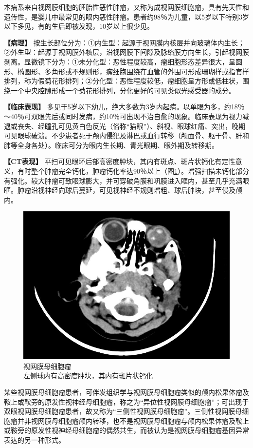 本病系来自视网膜细胞的胚胎性恶性肿瘤，又称为成视网膜细胞瘤，具有先天性和遗传性，是婴儿中最常见的眼内恶性肿瘤。患者约98％为儿童，以5岁以下特别3岁以下多见，有的生后即被发现，10岁以上很少见。

\textbf{【病理】}
按生长部位分为：①内生型：起源于视网膜内核层并向玻璃体内生长；②外生型：起源于视网膜外核层，沿视网膜下间隙及脉络膜方向生长，引起视网膜剥离。显微镜下分为：①未分化型：恶性程度较高，瘤细胞形态差异很大，呈圆形、椭圆形、多角形或不规则形，瘤细胞围绕在血管的外围可形成珊瑚样或指套样排列，称为假菊花形排列；②分化型：恶性程度较低，瘤细胞呈方形或低柱状，围绕一个中央腔隙形成一个菊花形排列，分化更好的可见类似光感受器的成分。

\textbf{【临床表现】}
多见于5岁以下幼儿，绝大多数为3岁内起病。以单眼为多，约18％～40％可双眼先后或同时发病，约10％可出现不治自愈的现象。临床表现为视力减退或丧失、经瞳孔可见黄白色反光（俗称“猫眼”）、斜视、眼球红痛、突出，晚期可见眼球破溃。不少患者死于颅内侵犯及淋巴或血行转移（颅面骨、躯干骨、肝和肺等全身各处）。临床可分为眼内生长期、青光眼期、眼外期及转移期。

\textbf{【CT表现】}
平扫可见眼环后部高密度肿块，其内有斑点、斑片状钙化有定性意义，有时整个肿瘤完全钙化，肿瘤钙化率达90％以上（图\ref{fig3-5}）。增强扫描未钙化部分有强化。较大肿瘤可致眼球膨大，并可穿破角膜和巩膜进入眶内，甚至几乎充满眼眶。肿瘤沿视神经向球后蔓延，可见视神经不规则增粗、球后肿块，甚至侵及颅内。

\begin{figure}[!htbp]
 \centering
 \includegraphics[width=.7\textwidth,height=\textheight,keepaspectratio]{./images/Image00103.jpg}
 \captionsetup{justification=centering}
 \caption{视网膜母细胞瘤\\{\small 左侧球内有高密度肿块，其内有斑片状钙化}}
 \label{fig3-5}
  \end{figure} 

某些视网膜母细胞瘤患者，可伴发组织学与视网膜母细胞瘤类似的颅内松果体瘤及鞍上或鞍旁的原发性视神经母细胞瘤，称之为“异位性视网膜母细胞瘤”；可出现于双眼视网膜母细胞瘤患者，故又称为“三侧性视网膜母细胞瘤”。三侧性视网膜母细胞瘤并非视网膜母细胞瘤颅内转移，也不是视网膜母细胞瘤与颅内松果体瘤及鞍上或鞍旁的原发性视神经母细胞瘤的偶然共生，而被认为是视网膜母细胞瘤基因异常表达的另一种形式。

